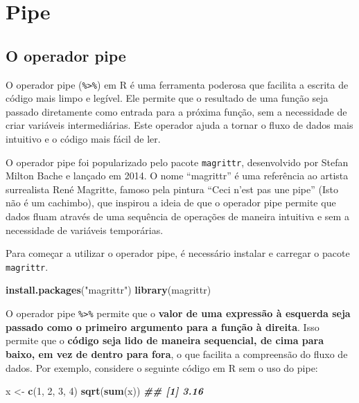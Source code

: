 \documentclass[
]{book}
\newenvironment{Shaded}{\begin{snugshade}}{\end{snugshade}}
\newcommand{\DecValTok}[1]{\textcolor[rgb]{0.00,0.00,0.81}{#1}}
\newcommand{\DocumentationTok}[1]{\textcolor[rgb]{0.56,0.35,0.01}{\textbf{\textit{#1}}}}
\newcommand{\FunctionTok}[1]{\textcolor[rgb]{0.13,0.29,0.53}{\textbf{#1}}}
\newcommand{\NormalTok}[1]{#1}
\newcommand{\OtherTok}[1]{\textcolor[rgb]{0.56,0.35,0.01}{#1}}
\newcommand{\StringTok}[1]{\textcolor[rgb]{0.31,0.60,0.02}{#1}}
\begin{document}
\chapter{Pipe}\label{pipe}

\section{O operador pipe}\label{o-operador-pipe}

O operador pipe (\texttt{\%\textgreater{}\%}) em R é uma ferramenta poderosa que facilita a
escrita de código mais limpo e legível. Ele permite que o resultado de
uma função seja passado diretamente como entrada para a próxima função,
sem a necessidade de criar variáveis intermediárias. Este operador ajuda
a tornar o fluxo de dados mais intuitivo e o código mais fácil de ler.

O operador pipe foi popularizado pelo pacote \texttt{magrittr}, desenvolvido
por Stefan Milton Bache e lançado em 2014. O nome ``magrittr'' é uma
referência ao artista surrealista René Magritte, famoso pela pintura
``Ceci n'est pas une pipe'' (Isto não é um cachimbo), que inspirou a ideia
de que o operador pipe permite que dados fluam através de uma sequência
de operações de maneira intuitiva e sem a necessidade de variáveis
temporárias.

Para começar a utilizar o operador pipe, é necessário instalar e
carregar o pacote \texttt{magrittr}.

\begin{Shaded}
\begin{Highlighting}[]
\FunctionTok{install.packages}\NormalTok{(}\StringTok{"magrittr"}\NormalTok{)}
\FunctionTok{library}\NormalTok{(magrittr)}
\end{Highlighting}
\end{Shaded}

O operador pipe \texttt{\%\textgreater{}\%} permite que o \textbf{valor de uma expressão à esquerda seja passado como o primeiro argumento para a função à direita}. Isso permite que o \textbf{código seja lido de maneira sequencial, de cima para baixo, em vez de dentro para fora}, o que facilita a compreensão do fluxo de dados. Por exemplo, considere o seguinte código em R sem o uso do pipe:

\begin{Shaded}
\begin{Highlighting}[]
\NormalTok{x }\OtherTok{\textless{}{-}} \FunctionTok{c}\NormalTok{(}\DecValTok{1}\NormalTok{, }\DecValTok{2}\NormalTok{, }\DecValTok{3}\NormalTok{, }\DecValTok{4}\NormalTok{)}
\FunctionTok{sqrt}\NormalTok{(}\FunctionTok{sum}\NormalTok{(x))}
\DocumentationTok{\#\# [1] 3.16}
\end{Highlighting}
\end{Shaded}
\end{document}
